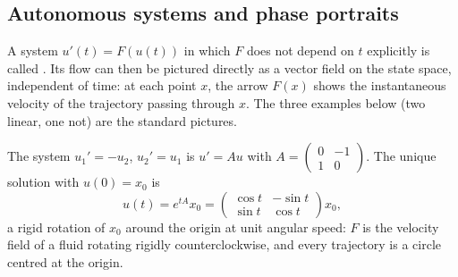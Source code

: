 \subsection{Autonomous systems and phase portraits}
\label{sec:autonomous_systems_examples}

A system $u'(t) = F(u(t))$ in which $F$ does not depend on $t$ explicitly is called
 . Its flow can then be pictured directly as a vector
field on the state space, independent of time: at each point $x$, the arrow $F(x)$ shows the
instantaneous velocity of the trajectory passing through $x$. The three examples below (two
linear, one not) are the standard pictures.

\begin{example}
\label{ex:autonomous_rotation}
The system $u_1'=-u_2$, $u_2'=u_1$ is $u'=Au$ with $A = \left(\begin{smallmatrix}0&-1\\1&0\end{smallmatrix}\right)$. The unique solution with $u(0)=x_0$ is
\[u(t) = e^{tA}x_0 = \begin{pmatrix}\cos t & -\sin t\\ \sin t & \cos t\end{pmatrix}x_0,\]
a rigid rotation of $x_0$ around the origin at unit angular speed: $F$ is the velocity field of a
fluid rotating rigidly counterclockwise, and every trajectory is a circle centred at the origin.
\begin{center}
\end{center}
\end{example}

